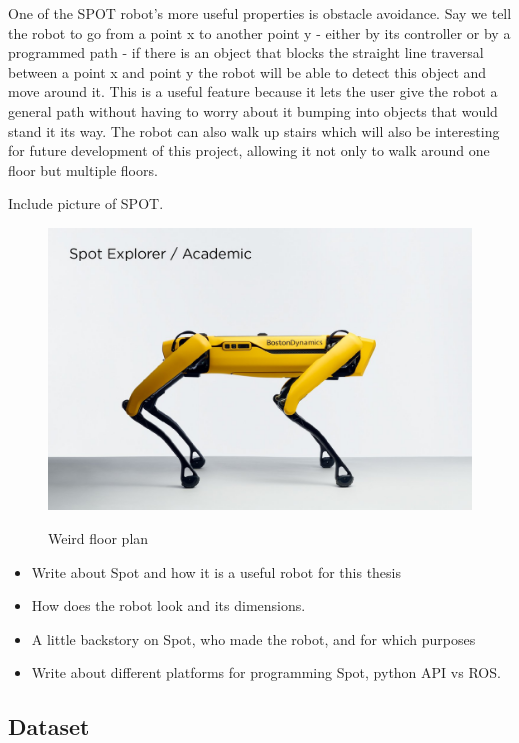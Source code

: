 One of the SPOT robot's more useful properties is obstacle avoidance. Say we tell the robot to go from a point x to another point y - either by its controller or by a programmed path - if there is an object that blocks the straight line traversal between a point x and point y the robot will be able to detect this object and move around it. 
This is a useful feature because it lets the user give the robot a general path without having to worry about it bumping into   objects that would stand it its way. 
The robot can also walk up stairs which will also be interesting for future development of this project, allowing it not only to walk around one floor but multiple floors.




Include picture of SPOT.
\begin{figure}[H]
    \centering
    \includegraphics[width=1\textwidth]{fig/Spot Explorer-1.jpeg}
    \label{}
    \caption[The SPOT robot]{Weird floor plan~\cite{spot_robot}}
\end{figure}


\begin{itemize}
    \item Write about Spot and how it is a useful robot for this thesis
    \item How does the robot look and its dimensions.
    \item A little backstory on Spot, who made the robot, and for which purposes
    \item Write about different platforms for programming Spot, python API vs ROS.
\end{itemize}


\subsection{Dataset}

